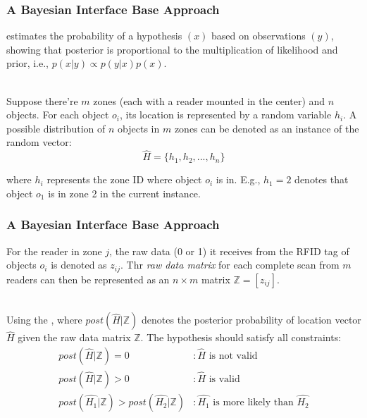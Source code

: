 
\begin{frame}
\frametitle{A Bayesian Interface Base Approach}

 estimates the probability of a hypothesis $(x)$ based on observations $(y)$, showing that posterior is proportional to the multiplication of likelihood and prior, i.e., $p(x|y) \propto p(y|x)p(x)$.\\~\\\pause

Suppose there're $m$ zones (each with a reader mounted in the center) and $n$ objects. For each object $o_i$, its location is represented by a random variable $h_i$. A possible distribution of $n$ objects in $m$ zones can be denoted as an instance of the random vector:\pause
\begin{equation}
  \hat{H} = \{ h_1, h_2, ..., h_n \}
\end{equation}
\pause

where $h_i$ represents the zone ID where object $o_i$ is in. E.g., $h_1 = 2$ denotes that object $o_1$ is in zone 2 in the current instance.

\end{frame}


\begin{frame}
\frametitle{A Bayesian Interface Base Approach}

For the reader in zone $j$, the raw data (0 or 1) it receives from the RFID tag of objects $o_i$ is denoted as $z_{ij}$. Thr \emph{raw data matrix} for each complete scan from $m$ readers can then be represented as an $n \times m$ matrix $\mathbb{Z} = [z_{ij}]$. \\~\\ \pause

Using the , where $post(\hat{H}|\mathbb{Z})$ denotes the posterior probability of location vector $\hat{H}$ given the raw data matrix $\mathbb{Z}$. The hypothesis should satisfy all constraints: \pause
\begin{equation}
  \begin{split}
  post(\hat{H}|\mathbb{Z}) = 0 & :\hat{H} \textrm{ is not valid} \\
  post(\hat{H}|\mathbb{Z}) > 0 & :\hat{H} \textrm{ is valid} \\
  post(\hat{H_1}|\mathbb{Z}) > post(\hat{H_2}|\mathbb{Z}) & :\hat{H_1} \textrm{ is more likely than } \hat{H_2}
  \end{split}
\end{equation}

\end{frame}

